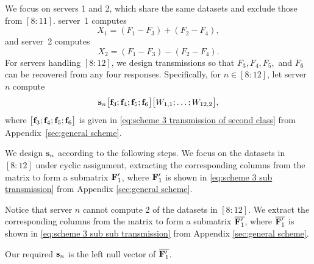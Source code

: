\documentclass[conference,letterpaper]{IEEEtran}
\begin{document}
\begin{example}

We focus on servers 1 and 2, which share the same datasets and exclude those from $[8{:}11]$. 
server~1 computes 
\[
X_1 = (F_1 - F_3) + (F_2 - F_4),
\]
and server~2 computes
\[
X_2 = (F_1 - F_3) - (F_2 - F_4).
\]
For servers handling $[8{:}12]$, we design transmissions so that $F_3, F_4, F_5,$ and $F_6$ 
can be recovered from any four responses. Specifically, for $n \in [8{:}12]$, let 
server~$n$ compute
\[
{\bf s}_n \bigl[ {\bf f}_3 ; {\bf f}_4 ; {\bf f}_5 ; {\bf f}_6 \bigr] 
\bigl[ W_{1,1}; \ldots; W_{12,2} \bigr],
\]
where $\bigl[ {\bf f}_3 ; {\bf f}_4 ; {\bf f}_5 ; {\bf f}_6 \bigr]$ is given in 
\eqref{eq:scheme 3 transmission of second class} from Appendix~\ref{sec:general scheme}.



We design ${\bf s}_n$ according to the following steps. We focus on the datasets in $[8:12]$ under cyclic assignment, extracting the corresponding columns from the matrix to form a submatrix ${\bf F}^{\prime}_1$, where ${\bf F}^{\prime}_1$ is shown in \eqref{eq:scheme 3 sub transmission} from Appendix \ref{sec:general scheme}.

Notice that server $n$ cannot compute 2 of the datasets in $[8:12]$. We extract the corresponding columns from the matrix to form a submatrix $\overline{{\bf F}^{\prime}_1}$, where $\overline{{\bf F}^{\prime}_1}$ is shown in \eqref{eq:scheme 3 sub sub transmission} from Appendix \ref{sec:general scheme}.

Our required ${\bf s}_n$ is the left null vector of $\overline{{\bf F}^{\prime}_1}$. 

\end{example}
\end{document}
